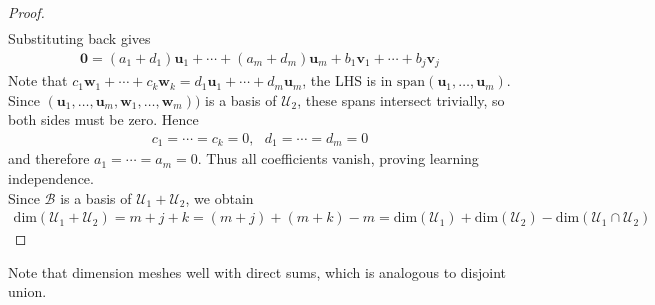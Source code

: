 \begin{theorem}
\begin{proof}
\begin{align}
\end{align}
Substituting back gives
\begin{align}
\mathbf{0} = (a_1 + d_1) \mathbf{u}_1 + \cdots + (a_m + d_m) \mathbf{u}_m + b_1 \mathbf{v}_1 + \cdots + b_j \mathbf{v}_j \nonumber
\end{align}
Note that $c_1 \mathbf{w}_1 + \cdots + c_k \mathbf{w}_k = d_1 \mathbf{u}_1 + \cdots + d_m \mathbf{u}_m$, the LHS is in $\text{span}(\mathbf{u}_1, \ldots, \mathbf{u}_m)$. Since $(\mathbf{u}_1, \ldots, \mathbf{u}_m, \mathbf{w}_1, \ldots, \mathbf{w}_m))$ is a basis of $\mathcal{U}_2$, these spans intersect trivially, so both sides must be zero. Hence
\begin{align}
c_1 = \cdots = c_k = 0, \ \ \ d_1 = \cdots = d_m = 0 \nonumber
\end{align}
and therefore $a_1 = \cdots = a_m = 0$. Thus all coefficients vanish, proving learning independence.\\
Since $\mathcal{B}$ is a basis of $\mathcal{U}_1 + \mathcal{U}_2$, we obtain
\begin{align}
\text{dim}(\mathcal{U}_1 + \mathcal{U}_2) = m + j + k = (m+j) + (m+k) - m = \text{dim}(\mathcal{U}_1) + \text{dim}(\mathcal{U}_2) - \text{dim}(\mathcal{U}_1 \cap \mathcal{U}_2) \nonumber
\end{align}
\end{proof}
\end{theorem}

Note that dimension meshes well with direct sums, which is analogous to disjoint union.

